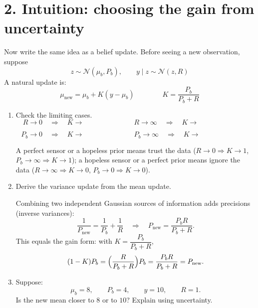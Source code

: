 \documentclass[11pt]{article}
\begin{document}
\newpage

\section*{2. Intuition: choosing the gain from uncertainty}
Now write the same idea as a belief update. Before seeing a new observation, suppose
\[
  z\sim \mathcal{N}(\mu_b,P_b),
  \qquad
  y\mid z\sim \mathcal{N}(z,R)
\]
A natural update is:
\[
  \mu_{\text{new}}=\mu_b+K(y-\mu_b) \qquad\qquad K=\frac{P_b}{P_b+R}
\]

\begin{enumerate}
  \item Check the limiting cases.
  \[
    R\to 0
    \quad\Rightarrow\quad
    K\to
    \hspace{3cm}
    R\to \infty
    \quad\Rightarrow\quad
    K\to
    \hspace{3cm}
  \]

  \vspace{1.4em}

  \[
    P_b\to 0
    \quad\Rightarrow\quad
    K\to
    \hspace{3cm}
    P_b\to \infty
    \quad\Rightarrow\quad
    K\to
    \hspace{3cm}
  \]

  \vspace{1.8em}

  \begin{solution}
  A perfect sensor or a hopeless prior means trust the data
  ($R\to0\Rightarrow K\to1$, $P_b\to\infty\Rightarrow K\to1$); a hopeless sensor
  or a perfect prior means ignore the data
  ($R\to\infty\Rightarrow K\to0$, $P_b\to0\Rightarrow K\to0$).
  \end{solution}

  \item Derive the variance update from the mean update.

  \vspace{5cm}

  \begin{solution}
  Combining two independent Gaussian sources of information adds precisions
  (inverse variances):
  \[
  \frac{1}{P_{\text{new}}}=\frac{1}{P_b}+\frac{1}{R}
  \quad\Rightarrow\quad
  P_{\text{new}}=\frac{P_b R}{P_b+R}.
  \]
  This equals the gain form: with $K=\dfrac{P_b}{P_b+R}$,
  \[
  (1-K)P_b=\Bigl(\frac{R}{P_b+R}\Bigr)P_b=\frac{P_b R}{P_b+R}=P_{\text{new}}.
  \]
  \end{solution}

  \item Suppose:
  \[
  \mu_b = 8, \qquad P_b = 4, \qquad y = 10, \qquad R = 1.
  \]
  Is the new mean closer to $8$ or to $10$? Explain using uncertainty.


\end{enumerate}
\end{document}
